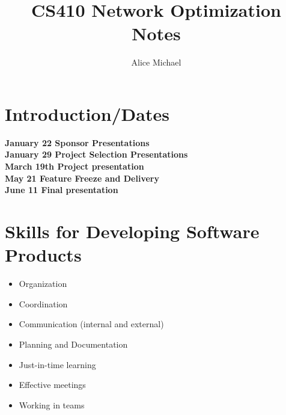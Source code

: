 \chead{}
\author{Alice Michael}
\title{CS410 Network Optimization Notes}
\date{}






\section*{Introduction/Dates}

{\bf{January 22 Sponsor Presentations}}\\
{\bf{January 29 Project Selection Presentations}}\\
{\bf{March 19th Project presentation}}\\
{\bf{May 21 Feature Freeze and Delivery}}\\
{\bf{June 11 Final presentation}}\\


\section*{Skills for Developing Software Products}
\begin{itemize}
  \itemsep-1.5em
  \item Organization\\
  \item Coordination\\
  \item Communication (internal and external)\\
  \item Planning and Documentation\\
  \item Just-in-time learning\\
  \item Effective meetings\\
  \item Working in teams\\
\end{itemize}


